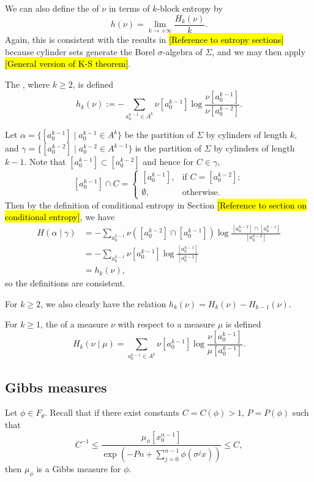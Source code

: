 We can also define the  of $\nu$ in terms of $k$-block entropy by
\[
	h(\nu) = \lim_{k \to +\infty}\frac{H_k(\nu)}{k}.
\]
Again, this is consistent with the results in \hl{[Reference to entropy sections]} because cylinder sets generate the Borel $\sigma$-algebra of $\Sigma$, and we may then apply \hl{[General version of K-S theorem]}.

\begin{definition}
	The , where $k \geq 2$, is defined
	\[
		h_k(\nu) := -\sum_{a_0^{k - 1} \in A^k}{\nu[a_0^{k - 1}] \log{\frac{\nu[a_0^{k - 1}]}{\nu[a_0^{k - 2}]}}}.
	\]
\end{definition}
Let $\alpha = \{[a_0^{k - 1}] \mid a_0^{k - 1} \in A^k\}$ be the partition of $\Sigma$ by cylinders of length $k$, and $\gamma = \{[a_0^{k - 2}] \mid a_0^{k - 2} \in A^{k - 1}\}$ is the partition of $\Sigma$ by cylinders of length $k - 1$. Note that $[a_0^{k - 1}] \subset [a_0^{k - 2}]$ and hence for $C \in \gamma$,
\[
	[a_0^{k - 1}] \cap C =
	\begin{cases}
		\left[a_0^{k - 1}\right],	& \text{if } C = [a_0^{k - 2}]; \\
		\emptyset,	& \text{otherwise}.
	\end{cases}
\]
Then by the definition of conditional entropy in Section \hl{[Reference to section on conditional entropy]}, we have
\begin{align*}
	H(\alpha \mid \gamma) &= -\sum_{a_0^{k - 1}}{\nu([a_0^{k - 2}] \cap [a_0^{k - 1}]) \log{\frac{[a_0^{k - 2}] \cap [a_0^{k - 1}]}{[a_0^{k - 2}]}}} \\
		&= -\sum_{a_0^{k - 1}}{\nu[a_0^{k - 1}] \log{\frac{[a_0^{k - 1}]}{[a_0^{k - 2}]}}} \\
		&= h_k(\nu),
\end{align*}
so the definitions are consistent.

For $k \geq 2$, we also clearly have the relation $h_k(\nu) = H_k(\nu) - H_{k - 1}(\nu)$.

\begin{definition}
	For $k \geq 1$, the  of a measure $\nu$ with respect to a measure $\mu$ is defined
	\[
		H_k(\nu \mid \mu) = \sum_{a_0^{k - 1} \in A^k}{\nu[a_0^{k - 1}] \log{\frac{\nu[a_0^{k - 1}]}{\mu[a_0^{k - 1}]}}}.
	\]
\end{definition}

\subsection{Gibbs measures}
Let $\phi \in F_\theta$. Recall that if there exist constants $C = C(\phi) > 1$, $P = P(\phi)$ such that
\[
	C^{-1} \leq \frac{\mu_\phi[x_0^{n - 1}]}{\exp\left(-Pn + \sum_{j = 0}^{n - 1}{\phi(\sigma^j x)}\right)} \leq C,
\]
then $\mu_\phi$ is a Gibbs measure for $\phi$.


